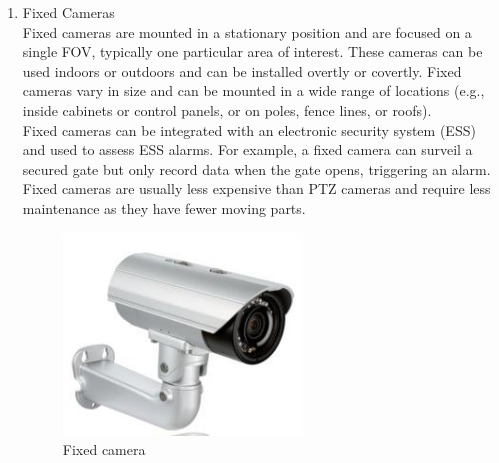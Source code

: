 \documentclass[12pt,fleqn]{book} %
\begin{document}
\begin{enumerate}
    \item Fixed Cameras
    \\Fixed cameras are mounted in a stationary position and are focused on a single FOV, typically one particular area of interest. These cameras can be used indoors or outdoors and can be installed overtly or covertly. Fixed cameras vary in size and can be mounted in a wide range of locations (e.g., inside cabinets or control panels, or on poles, fence lines, or roofs). 
    \\Fixed cameras can be integrated with an electronic security system (ESS) and used to assess ESS alarms. For example, a fixed camera can surveil a secured gate but only record data when the gate opens, triggering an alarm. Fixed cameras are usually less expensive than PTZ cameras and require less maintenance as they have fewer moving parts. 
    \begin{figure}[!h]
    \centering
    \includegraphics[width=0.5\linewidth]{c 2.png}
    \caption{Fixed camera}
    \label{fig:c 2}
    \end{figure}
    

\end{enumerate}
\end{document}
